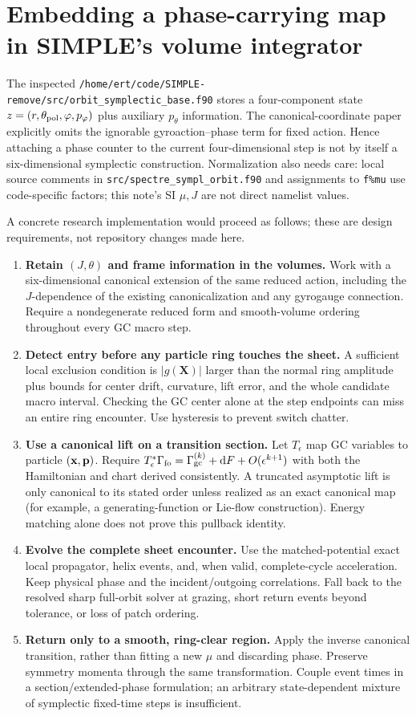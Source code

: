 \documentclass[10pt,a4paper]{article}
\newcommand{\X}{\mathbf X}\newcommand{\n}{\mathbf n}
\newcommand{\pathref}[1]{\texttt{\nolinkurl{#1}}}
\begin{document}
\section{Embedding a phase-carrying map in SIMPLE's volume integrator}
\label{sec:simple}
The inspected \pathref{/home/ert/code/SIMPLE-remove/src/orbit_symplectic_base.f90} stores a four-component state $z=(r,\theta_{\rm pol},\varphi,p_\varphi)$ plus auxiliary $p_\theta$ information. The canonical-coordinate paper \cite{simple} explicitly omits the ignorable gyroaction--phase term for fixed action. Hence attaching a phase counter to the current four-dimensional step is not by itself a six-dimensional symplectic construction. Normalization also needs care: local source comments in \pathref{src/spectre_sympl_orbit.f90} and assignments to \texttt{f\%mu} use code-specific factors; this note's SI $\mu,J$ are not direct namelist values.

A concrete research implementation would proceed as follows; these are design requirements, not repository changes made here.
\begin{enumerate}
\item \textbf{Retain $(J,\theta)$ and frame information in the volumes.} Work with a six-dimensional canonical extension of the same reduced action, including the $J$-dependence of the existing canonicalization and any gyrogauge connection. Require a nondegenerate reduced form and smooth-volume ordering throughout every GC macro step.
\item \textbf{Detect entry before any particle ring touches the sheet.} A sufficient local exclusion condition is $|g(\X)|$ larger than the normal ring amplitude plus bounds for center drift, curvature, lift error, and the whole candidate macro interval. Checking the GC center alone at the step endpoints can miss an entire ring encounter. Use hysteresis to prevent switch chatter.
\item \textbf{Use a canonical lift on a transition section.} Let $T_\epsilon$ map GC variables to particle $(\mathbf x,\mathbf p)$. Require $T_\epsilon^*\Gamma_{\rm fo}=\Gamma_{\rm gc}^{(k)}+\mathrm d F+O(\epsilon^{k+1})$ with both the Hamiltonian and chart derived consistently. A truncated asymptotic lift is only canonical to its stated order unless realized as an exact canonical map (for example, a generating-function or Lie-flow construction). Energy matching alone does not prove this pullback identity.
\item \textbf{Evolve the complete sheet encounter.} Use the matched-potential exact local propagator, helix events, and, when valid, complete-cycle acceleration. Keep physical phase and the incident/outgoing correlations. Fall back to the resolved sharp full-orbit solver at grazing, short return events beyond tolerance, or loss of patch ordering.
\item \textbf{Return only to a smooth, ring-clear region.} Apply the inverse canonical transition, rather than fitting a new $\mu$ and discarding phase. Preserve symmetry momenta through the same transformation. Couple event times in a section/extended-phase formulation; an arbitrary state-dependent mixture of symplectic fixed-time steps is insufficient.
\end{enumerate}
\end{document}
